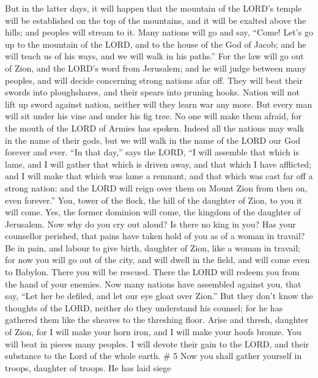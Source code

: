 But in the latter days, it will happen that the mountain
of the LORD's temple will be established on the top of the mountains,
and it will be exalted above the hills; and peoples will stream to it.
 Many nations will go and say, ``Come! Let's go up to the
mountain of the LORD, and to the house of the God of Jacob; and he will
teach us of his ways, and we will walk in his paths.'' For the law will
go out of Zion, and the LORD's word from Jerusalem;  and
he will judge between many peoples, and will decide concerning strong
nations afar off. They will beat their swords into ploughshares, and
their spears into pruning hooks. Nation will not lift up sword against
nation, neither will they learn war any more.  But every
man will sit under his vine and under his fig tree. No one will make
them afraid, for the mouth of the LORD of Armies has spoken.
 Indeed all the nations may walk in the name of their
gods, but we will walk in the name of the LORD our God forever and ever.
 ``In that day,'' says the LORD, ``I will assemble that
which is lame, and I will gather that which is driven away, and that
which I have afflicted;  and I will make that which was
lame a remnant, and that which was cast far off a strong nation: and the
LORD will reign over them on Mount Zion from then on, even forever.''
 You, tower of the flock, the hill of the daughter of
Zion, to you it will come. Yes, the former dominion will come, the
kingdom of the daughter of Jerusalem.  Now why do you cry
out aloud? Is there no king in you? Has your counsellor perished, that
pains have taken hold of you as of a woman in travail? 
Be in pain, and labour to give birth, daughter of Zion, like a woman in
travail; for now you will go out of the city, and will dwell in the
field, and will come even to Babylon. There you will be rescued. There
the LORD will redeem you from the hand of your enemies. 
Now many nations have assembled against you, that say, ``Let her be
defiled, and let our eye gloat over Zion.''  But they
don't know the thoughts of the LORD, neither do they understand his
counsel; for he has gathered them like the sheaves to the threshing
floor.  Arise and thresh, daughter of Zion, for I will
make your horn iron, and I will make your hoofs bronze. You will beat in
pieces many peoples. I will devote their gain to the LORD, and their
substance to the Lord of the whole earth. \# 5  Now you
shall gather yourself in troops, daughter of troops. He has laid siege
